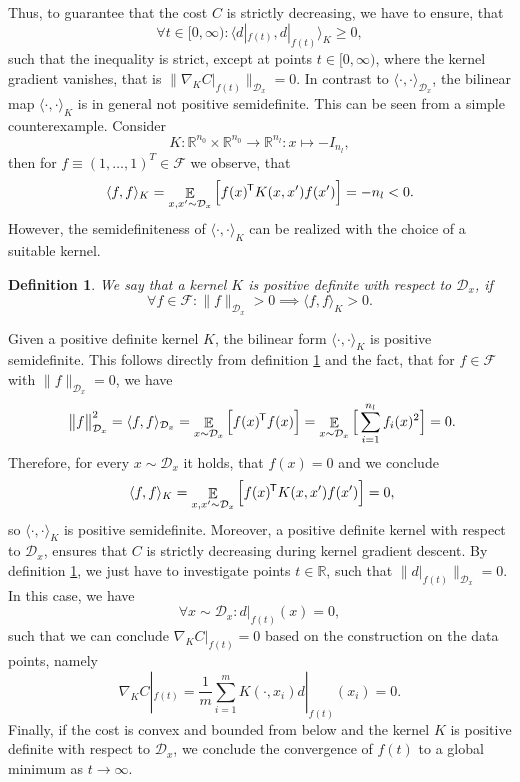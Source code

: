 \documentclass[11pt, a4paper]{article}
\newtheorem{definition}[theorem]{Definition}
\newcommand{\R}{\mathbb{R}}
\newcommand{\D}{\mathcal{D}}
\newcommand{\F}{\mathcal{F}}
\newcommand*{\tr}{^{\mkern-1.5mu\mathsf{T}}}
\DeclareMathOperator*{\E}{\mathbb{E}}
\begin{document}
Thus, to guarantee that the cost $C$ is strictly decreasing, we have to ensure, that
\[ \forall t \in [0,\infty) : \big \langle d|_{f(t)}, d|_{f(t)} \big \rangle_{K} \geq 0, \]
such that the inequality is strict, except at points $t \in [0,\infty)$, where the kernel gradient vanishes, that is $\big \| \nabla_KC|_{f(t)} \big \|_{\D_x} = 0$. In contrast to $\langle \cdot , \cdot \rangle_{\D_x}$, the bilinear map $\langle \cdot , \cdot \rangle_{K}$ is in general not positive semidefinite. This can be seen from a simple counterexample. Consider
\[ K: \R^{n_0} \times \R^{n_0} \to \R^{n_l} : x \mapsto - I_{n_l}, \]
then for $f \equiv (1, \dots, 1)^T \in \F$ we observe, that
\[ \langle f , f \rangle_{K} = \E_{x,x' \sim \D_x} \Big [ f(x)\tr K(x,x')f(x') \Big ] = -n_l < 0. \]
However, the semidefiniteness of $\langle \cdot , \cdot \rangle_{K}$ can be realized with the choice of a suitable kernel.

\begin{definition} \label{def:definite}
We say that a kernel $K$ is positive definite with respect to $\D_x$, if 
\[ \forall f \in \F: \| f \|_{\D_x} > 0 \implies \langle f,f \rangle_K > 0. \]
\end{definition}

Given a positive definite kernel $K$, the bilinear form $\langle \cdot , \cdot \rangle_{K}$ is positive semidefinite. This follows directly from definition \ref{def:definite} and the fact, that for $f \in \F$ with $\| f \|_{\D_x} = 0$, we have
\[ \big \| f \big \|_{\D_x}^2 = \langle f, f \rangle_{\D_x} = \E_{x \sim \D_x} \Big [ f(x) \tr f(x) \Big ] = \E_{x \sim \D_x} \Big [ \sum_{i=1}^{n_l}f_i(x)^2 \Big ] = 0. \]
Therefore, for every $x \sim \D_x$ it holds, that $f(x)=0$ and we conclude
\[ \langle f,f \rangle_K = \E_{x,x' \sim \D_x} \Big [ f(x) \tr K(x,x') f(x') \Big ] = 0, \]
so $\langle \cdot, \cdot \rangle_K$ is positive semidefinite. Moreover, a positive definite kernel with respect to $\D_x$, ensures that $C$ is strictly decreasing during kernel gradient descent. By definition \ref{def:definite}, we just have to investigate points $t \in \R$, such that $\big \| d|_{f(t)} \big \|_{\D_x} = 0$. In this case, we have
\[ \forall x \sim \D_x : d|_{f(t)}(x) = 0, \]
such that we can conclude $\nabla_K C|_{f(t)} = 0$ based on the construction on the data points, namely
\[ \nabla_KC|_{f(t)} = \frac{1}{m} \sum_{i=1}^{m} K(\cdot,x_i)d|_{f(t)}(x_i) = 0.\]
Finally, if the cost is convex and bounded from below and the kernel $K$ is positive definite with respect to $\D_x$, we conclude the convergence of $f(t)$ to a global minimum as $t \to \infty$. \\
\end{document}
